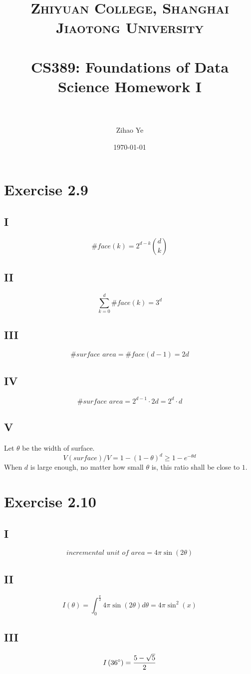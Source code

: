 \documentclass[paper=a4, fontsize=11pt]{scrartcl} %
\title{	
\normalfont \normalsize 
\textsc{Zhiyuan College, Shanghai Jiaotong University} \\ %
\horrule{0.5pt} \\[0.4cm] %
\huge CS389: Foundations of Data Science Homework I\\ %
\horrule{2pt} \\ %
}
\author{Zihao Ye} %
\date{\normalsize\today} %
\numberwithin{equation}{section} %
\numberwithin{figure}{section} %
\numberwithin{table}{section} %
\begin{document}
\maketitle %

\section*{Exercise 2.9}
\subsection*{I}
$$\textit{\#face}(k) = 2^{d-k}{d \choose k} $$
\subsection*{II}
$$\sum_{k=0}^{d}\textit{\#face}(k) = 3^d $$ 
\subsection*{III}
$$\textit{\#surface area} = \textit{\#face}(d - 1) = 2d $$
\subsection*{IV}
$$\textit{\#surface area} = 2^{d-1} \cdot 2d = 2^d\cdot d $$
\subsection*{V}
Let $\theta$ be the width of surface.
$$V(\textit{surface}) / V = 1 - (1-\theta)^d \geq 1 - e^{-\theta d}$$
When $d$ is large enough, no matter how small $\theta$ is, this ratio shall be close to $1$.
\section*{Exercise 2.10}
\subsection*{I}
$$\textit{incremental unit of area} = 4\pi \sin(2\theta) $$
\subsection*{II}
$$I(\theta) = \int_{0}^{\frac{\pi}{2}} 4\pi \sin(2\theta) d\theta = 4\pi \sin^2(x)$$
\subsection*{III}
$$I\left(36\degree\right) = \frac{5 - \sqrt{5}}{2}  $$
\end{document}
